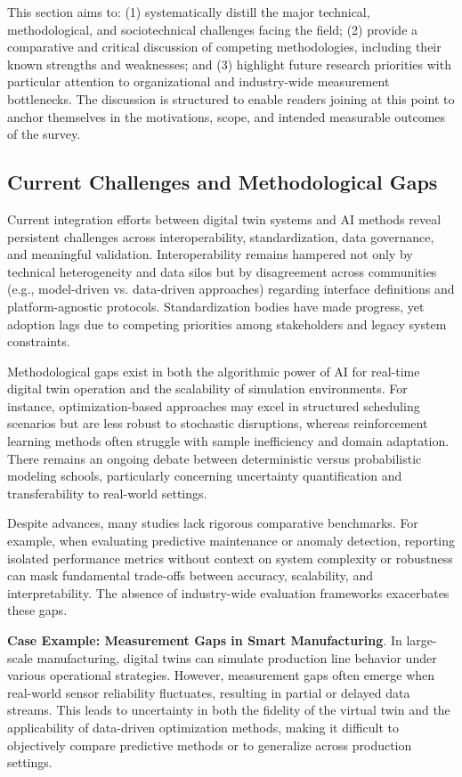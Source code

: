 \documentclass[sigconf]{acmart}
\begin{document}
This section aims to: (1) systematically distill the major technical, methodological, and sociotechnical challenges facing the field; (2) provide a comparative and critical discussion of competing methodologies, including their known strengths and weaknesses; and (3) highlight future research priorities with particular attention to organizational and industry-wide measurement bottlenecks. The discussion is structured to enable readers joining at this point to anchor themselves in the motivations, scope, and intended measurable outcomes of the survey.

\subsection{Current Challenges and Methodological Gaps}

Current integration efforts between digital twin systems and AI methods reveal persistent challenges across interoperability, standardization, data governance, and meaningful validation. Interoperability remains hampered not only by technical heterogeneity and data silos but by disagreement across communities (e.g., model-driven vs. data-driven approaches) regarding interface definitions and platform-agnostic protocols. Standardization bodies have made progress, yet adoption lags due to competing priorities among stakeholders and legacy system constraints.

Methodological gaps exist in both the algorithmic power of AI for real-time digital twin operation and the scalability of simulation environments. For instance, optimization-based approaches may excel in structured scheduling scenarios but are less robust to stochastic disruptions, whereas reinforcement learning methods often struggle with sample inefficiency and domain adaptation. There remains an ongoing debate between deterministic versus probabilistic modeling schools, particularly concerning uncertainty quantification and transferability to real-world settings.

Despite advances, many studies lack rigorous comparative benchmarks. For example, when evaluating predictive maintenance or anomaly detection, reporting isolated performance metrics without context on system complexity or robustness can mask fundamental trade-offs between accuracy, scalability, and interpretability. The absence of industry-wide evaluation frameworks exacerbates these gaps. 

\textbf{Case Example: Measurement Gaps in Smart Manufacturing}. In large-scale manufacturing, digital twins can simulate production line behavior under various operational strategies. However, measurement gaps often emerge when real-world sensor reliability fluctuates, resulting in partial or delayed data streams. This leads to uncertainty in both the fidelity of the virtual twin and the applicability of data-driven optimization methods, making it difficult to objectively compare predictive methods or to generalize across production settings.
\end{document}
